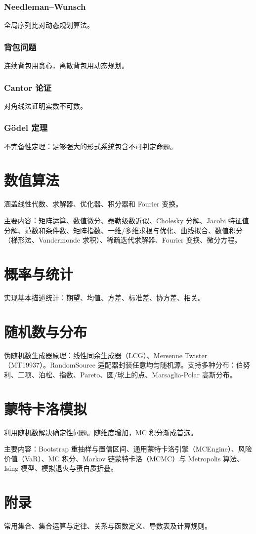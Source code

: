 \documentclass[justified, sixbynine]{tufte-book}
\theoremstyle{plain}%
\newtheorem * {corollary}{推论}
\theoremstyle{definition}
\theoremstyle{remark}
\newtheorem * {remark}{注记}
\newtheorem * {note}{注释}
\begin{document}
\begin{fullwidth}
\subsection{Needleman--Wunsch}
全局序列比对动态规划算法。

\subsection{背包问题}
连续背包用贪心，离散背包用动态规划。

\subsection{Cantor 论证}
对角线法证明实数不可数。

\subsection{Gödel 定理}
不完备性定理：足够强大的形式系统包含不可判定命题。

\goodbreak\chapter{数值算法}

涵盖线性代数、求解器、优化器、积分器和 Fourier 变换。

主要内容：矩阵运算、数值微分、泰勒级数近似、Cholesky 分解、Jacobi 特征值分解、范数和条件数、矩阵指数、一维/多维求根与优化、曲线拟合、数值积分（梯形法、Vandermonde 求积）、稀疏迭代求解器、Fourier 变换、微分方程。

\goodbreak\chapter{概率与统计}

实现基本描述统计：期望、均值、方差、标准差、协方差、相关。

\goodbreak\chapter{随机数与分布}

伪随机数生成器原理：线性同余生成器（LCG）、Mersenne Twister（MT19937）。RandomSource 适配器封装任意均匀随机源。支持多种分布：伯努利、二项、泊松、指数、Pareto、圆/球上的点、Marsaglia-Polar 高斯分布。

\goodbreak\chapter{蒙特卡洛模拟}

利用随机数解决确定性问题。随维度增加，MC 积分渐成首选。

主要内容：Bootstrap 重抽样与置信区间、通用蒙特卡洛引擎（MCEngine）、风险价值（VaR）、MC 积分、Markov 链蒙特卡洛（MCMC）与 Metropolis 算法、Ising 模型、模拟退火与蛋白质折叠。

\chapter{附录}

常用集合、集合运算与定律、关系与函数定义、导数表及计算规则。

\end{fullwidth}
\end{document}
